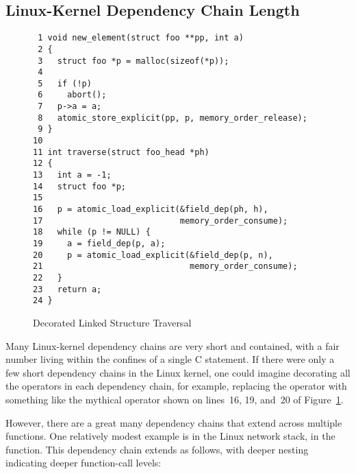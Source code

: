 \documentclass[letterpaper,twocolumn,10pt]{article}
\begin{document}
\subsection{Linux-Kernel Dependency Chain Length}
\label{sec:Linux-Kernel Dependency Chain Length}

\begin{figure}[tbp]
{ \scriptsize
\begin{verbatim}
 1 void new_element(struct foo **pp, int a)
 2 {
 3   struct foo *p = malloc(sizeof(*p));
 4 
 5   if (!p)
 6     abort();
 7   p->a = a;
 8   atomic_store_explicit(pp, p, memory_order_release);
 9 }
10 
11 int traverse(struct foo_head *ph)
12 {
13   int a = -1;
14   struct foo *p;
15 
16   p = atomic_load_explicit(&field_dep(ph, h),
17                            memory_order_consume);
18   while (p != NULL) {
19     a = field_dep(p, a);
20     p = atomic_load_explicit(&field_dep(p, n),
21                              memory_order_consume);
22   }
23   return a;
24 }
\end{verbatim}
}
\caption{Decorated Linked Structure Traversal}
\label{fig:Decorated Linked Structure Traversal}
\end{figure}

Many Linux-kernel dependency chains are very short and contained,
with a fair number living within the confines of a single C statement.
If there were only a few short dependency chains in the Linux kernel,
one could imagine decorating all the operators in each dependency
chain, for example, replacing the \co{->} operator with something
like the mythical  operator shown on lines~16,
19, and~20 of
Figure~\ref{fig:Decorated Linked Structure Traversal}.

However, there are a great many dependency chains that extend across
multiple functions.
One relatively modest example is in the Linux network stack, in
the  function.
This dependency chain extends as follows, with deeper nesting indicating
deeper function-call levels:
\end{document}
